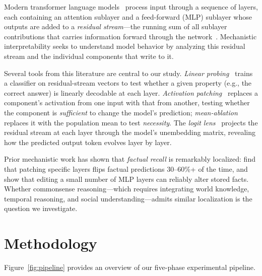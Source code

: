 \documentclass{article}
\begin{document}
Modern transformer language models~\citep{Vaswani+2017} process input through a sequence of layers, each containing an attention sublayer and a feed-forward (MLP) sublayer whose outputs are added to a \emph{residual stream}---the running sum of all sublayer contributions that carries information forward through the network~\citep{elhage2021mathematical}.
Mechanistic interpretability seeks to understand model behavior by analyzing this residual stream and the individual components that write to it.

Several tools from this literature are central to our study.
\emph{Linear probing}~\citep{belinkov2022probing} trains a classifier on residual-stream vectors to test whether a given property (e.g., the correct answer) is linearly decodable at each layer.
\emph{Activation patching}~\citep{meng2022locating, wang2022interpretability} replaces a component's activation from one input with that from another, testing whether the component is \emph{sufficient} to change the model's prediction; \emph{mean-ablation} replaces it with the population mean to test \emph{necessity}.
The \emph{logit lens}~\citep{nostalgebraist2020logitlens} projects the residual stream at each layer through the model's unembedding matrix, revealing how the predicted output token evolves layer by layer.

Prior mechanistic work has shown that \emph{factual recall} is remarkably localized: \citet{geva2023dissecting} find that patching specific layers flips factual predictions 30--60\%+ of the time, and \citet{meng2022locating} show that editing a small number of MLP layers can reliably alter stored facts.
Whether commonsense reasoning---which requires integrating world knowledge, temporal reasoning, and social understanding---admits similar localization is the question we investigate.

\section{Methodology}
\label{sec:methods}

Figure~\ref{fig:pipeline} provides an overview of our five-phase experimental pipeline.
\end{document}
